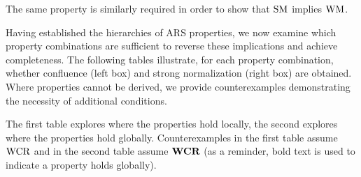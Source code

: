 The same property is similarly required in order to show that $\mathrm{SM}$ implies $\mathrm{WM}$.

Having established the hierarchies of ARS properties, we now examine which property combinations are sufficient to reverse these implications and achieve completeness. The following tables illustrate, for each property combination, whether confluence (left box) and strong normalization (right box) are obtained. Where properties cannot be derived, we provide counterexamples demonstrating the necessity of additional conditions.

The first table explores where the properties hold locally, the second explores where the properties hold globally. Counterexamples in the 
first table assume $\mathrm{WCR}$ and in the second table assume $\mathbf{WCR}$ (as a reminder, bold text is used to indicate a property holds globally). 

\clearpage
\renewcommand*{\thefootnote}{\fnsymbol{footnote}}



